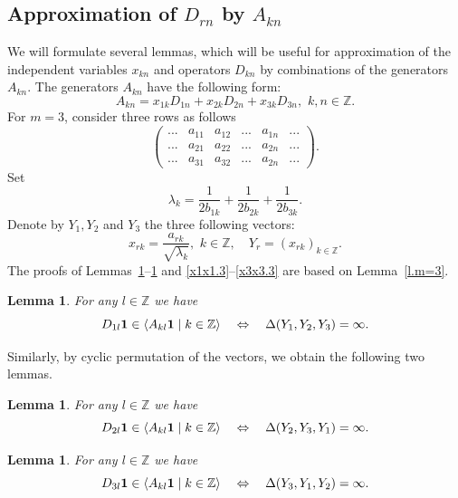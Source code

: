 \documentclass[preprint,12pt]{elsarticle}
\newcommand{\commA}[1]{\marginpar{%
\begin{color}{red}
\vskip-\baselineskip %
\raggedright\footnotesize
\itshape\hrule \smallskip A: #1\par\smallskip\hrule\end{color}}}
\newtheorem{lem}[thm]{Lemma}
\numberwithin{equation}{section}
\begin{document}
\subsection{Approximation of $D_{rn}$ by $A_{kn}$}
We will formulate several  lemmas, which will be  useful for
approximation of the independent variables $x_{kn}$ and operators
$D_{kn}$ by combinations of the generators $A_{kn}$. 
The generators $A_{kn}$ have the following form:
$$
A_{kn}=x_{1k}D_{1n}+x_{2k}D_{2n}+x_{3k}D_{3n},\,\,k,n\in \mathbb Z.
$$
For $m=3$, consider three rows as follows
$$
\left(
\begin{array}{cccccc}
...&a_{11}&a_{12}&...&a_{1n}&...\\
...&a_{21}&a_{22}&...&a_{2n}&...\\
...&a_{31}&a_{32}&...&a_{2n}&...
\end{array}
\right).
$$
Set
\begin{equation}
 \label{lambda(D)}
\lambda_k=\frac{1}{2b_{1k}}+\frac{1}{2b_{2k}}+\frac{1}{2b_{3k}}.
\end{equation}
Denote by $Y_1,Y_2$ and $Y_3$ the three following vectors:
\begin{equation}
 \label{Y(1),Y(3),Y(3)}
 x_{rk}=\frac{a_{rk}}{\sqrt{\lambda_k}},\,\,k\in{\mathbb Z}
 ,\quad Y_r=(x_{rk})_{k\in {\mathbb Z}}.
\end{equation}
The proofs of  Lemmas~\ref{d1.3}--\ref{d3.3} and  \ref{x1x1.3}--\ref{x3x3.3}
are based on Lemma~\ref{l.m=3}.
%
% 
\begin{lem}
\label{d1.3}
For any  $l\in {\mathbb Z}$ we have
$$
D_{1l}{\bf 1}\in\langle A_{kl}{\bf 1}\mid k\in {\mathbb Z}\rangle
\quad\Leftrightarrow\quad \Delta(Y_1,Y_2,Y_3)=\infty.
$$
\end{lem}
% 
Similarly, by cyclic permutation 
of the vectors, 
we obtain the following two lemmas.
\begin{lem}
\label{d2.3}
 For any  $l\in {\mathbb Z}$ we have
$$
D_{2l}{\bf 1}\in\langle A_{kl}{\bf 1}\mid k\in {\mathbb Z}\rangle
\quad\Leftrightarrow\quad \Delta(Y_2,Y_3,Y_1)=\infty.
$$
\end{lem}
\begin{lem}
\label{d3.3}
 For any  $l\in {\mathbb Z}$ we have
$$
D_{3l}{\bf 1}\in\langle A_{kl}{\bf 1}\mid k\in {\mathbb Z}\rangle
\quad\Leftrightarrow\quad \Delta(Y_3,Y_1,Y_2)=\infty.
$$
\end{lem}
\end{document}
